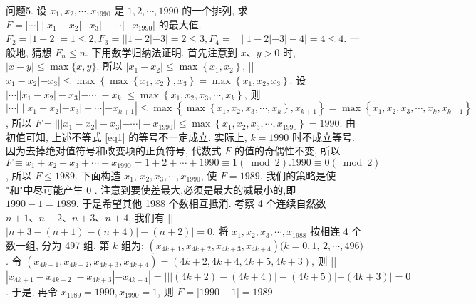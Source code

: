 问题5. 设 $x_1, x_2, \cdots, x_{1990}$ 是 $1,2, \cdots, 1990$ 的一个排列, 求 $F=|\cdots| \mid x_1- x_2\left|-x_3\right|-\cdots\left|-x_{1990}\right|$ 的最大值.
$F_2=|1-2|=1 \leqslant 2, F_3=|| 1-2|-3|=2 \leqslant 3, F_4=|| \mid 1- 2|-3|-4 \mid=4 \leqslant 4$. 一般地, 猜想 $F_n \leqslant n$. 下用数学归纳法证明.
首先注意到 $x 、 y>0$ 时, $|x-y| \leqslant \max \{x, y\}$. 所以 $\left|x_1-x_2\right| \leqslant \max \left\{x_1, x_2\right\}$, ||$x_1-x_2\left|-x_3\right| \leqslant \max \left\{\max \left\{x_1, x_2\right\}, x_3\right\}=\max \left\{x_1, x_2, x_3\right\}$. 设 $|\cdots|\left|x_1-x_2\right|-x_3|-\cdots|-x_k \mid \leqslant \max \left\{x_1, x_2, x_3, \cdots, x_k\right\}$, 则 $|\cdots| \mid x_1- x_2\left|-x_3\right|-\cdots\left|-x_{k+1}\right| \leqslant \max \left\{\max \left\{x_1, x_2, x_3, \cdots, x_k\right\}, x_{k+1}\right\}=\max \left\{x_1, x_2, x_3, \cdots, x_k, x_{k+1}\right\} \label{eq1}$, 所以 $F=||\left|x_1-x_2\right|-x_3|-\cdots|-x_{1990} \mid \leqslant \max \left\{x_1, x_2, x_3, \cdots, x_{1990}\right\}=1990$. 由初值可知, 上述不等式 \ref{eq1} 的等号不一定成立.
实际上, $k=1990$ 时不成立等号.
因为去掉绝对值符号和改变项的正负符号, 代数式 $F$ 的值的奇偶性不变, 所以 $F \equiv x_1+x_2+x_3+\cdots+x_{1990}=1+ 2+\cdots+1990 \equiv 1(\bmod 2) .1990 \equiv 0(\bmod 2)$, 所以 $F \leqslant 1989$. 下面构造 $x_1$, $x_2, x_3, \cdots, x_{1990}$, 使 $F=1989$. 我们的策略是使 "和"中尽可能产生 0 . 注意到要使差最大,必须是最大的减最小的,即 $1990-1=1989$. 于是希望其他 1988 个数相互抵消.
考察 4 个连续自然数 $n+1 、 n+2 、 n+3 、 n+4$, 我们有 || $\mid n+ 3-(n+1)|-(n+4)|-(n+2) \mid=0$. 将 $x_1, x_2, x_3, \cdots, x_{1988}$ 按相连 4 个数一组, 分为 497 组, 第 $k$ 组为: $\left(x_{4 k+1}, x_{4 k+2}, x_{4 k+3}, x_{4 k+4}\right)(k=0,1$, $2, \cdots, 496)$. 令 $\left(x_{4 k+1}, x_{4 k+2}, x_{4 k+3}, x_{4 k+4}\right)=(4 k+2,4 k+4,4 k+5,4 k+ 3)$, 则 ||$\left|x_{4 k+1}-x_{4 k+2}\right|-x_{4 k+3}\left|-x_{4 k+4}\right|=|||(4 k+2)-(4 k+4)|-(4 k+ 5)|-(4 k+3)|=0$. 于是, 再令 $x_{1989}=1990, x_{1990}=1$, 则 $F=\mid 1990- 1 \mid=1989$.




